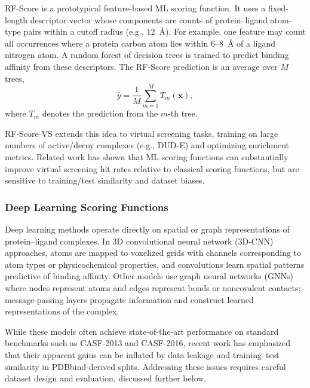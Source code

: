 \documentclass[12pt]{article}
\begin{document}
RF-Score is a prototypical feature-based ML scoring function.\cite{CH3_Ballester2010_RFScore} It uses a fixed-length descriptor vector whose components are counts of protein--ligand atom-type pairs within a cutoff radius (e.g., 12~\AA). For example, one feature may count all occurrences where a protein carbon atom lies within 6--8~\AA{} of a ligand nitrogen atom. A random forest of decision trees is trained to predict binding affinity from these descriptors. The RF-Score prediction is an average over $M$ trees,
\begin{equation}
\hat{y} = \frac{1}{M} \sum_{m=1}^{M} T_m(\mathbf{x}),
\end{equation}
where $T_m$ denotes the prediction from the $m$-th tree.

RF-Score-VS extends this idea to virtual screening tasks, training on large numbers of active/decoy complexes (e.g., DUD-E) and optimizing enrichment metrics.\cite{CH3_Wojcikowski2017_RFScoreVS} Related work has shown that ML scoring functions can substantially improve virtual screening hit rates relative to classical scoring functions, but are sensitive to training/test similarity and dataset biases.\cite{CH3_CH3_li2021machine,CH3_CH3_li2017structural}

\subsubsection{Deep Learning Scoring Functions}

Deep learning methods operate directly on spatial or graph representations of protein--ligand complexes. In 3D convolutional neural network (3D-CNN) approaches, atoms are mapped to voxelized grids with channels corresponding to atom types or physicochemical properties, and convolutions learn spatial patterns predictive of binding affinity.\cite{CH3_Jimenez2018_KDEEP} Other models use graph neural networks (GNNs) where nodes represent atoms and edges represent bonds or noncovalent contacts; message-passing layers propagate information and construct learned representations of the complex.\cite{CH3_Wang2017}

While these models often achieve state-of-the-art performance on standard benchmarks such as CASF-2013 and CASF-2016, recent work has emphasized that their apparent gains can be inflated by data leakage and training--test similarity in PDBbind-derived splits.\cite{CH3_li2021machine,CH3_li2017structural} Addressing these issues requires careful dataset design and evaluation, discussed further below.
\end{document}
